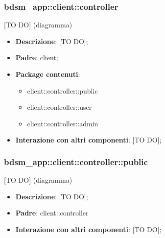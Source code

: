 %
%


\subsubsection{bdsm\_app::client::controller} %
\label{ssub:bdsm_app_client_controller}
[TO DO] (diagramma) \newline \newline

\begin{itemize}
	\item \textbf{Descrizione}: [TO DO];
	\item \textbf{Padre}: client;
	\item \textbf{Package contenuti}:
		\begin{itemize}
			\item client::controller::public
			\item client::controller::user
			\item client::controller::admin
		\end{itemize}
	\item \textbf{Interazione con altri componenti}: [TO DO];
\end{itemize}


\subsubsection{bdsm\_app::client::controller::public} %
\label{ssub:bdsm_app_client_controller_public}
[TO DO] (diagramma) \newline \newline

\begin{itemize}
	\item \textbf{Descrizione}: [TO DO];
	\item \textbf{Padre}: client::controller
	\item \textbf{Interazione con altri componenti}: [TO DO];
\end{itemize}

